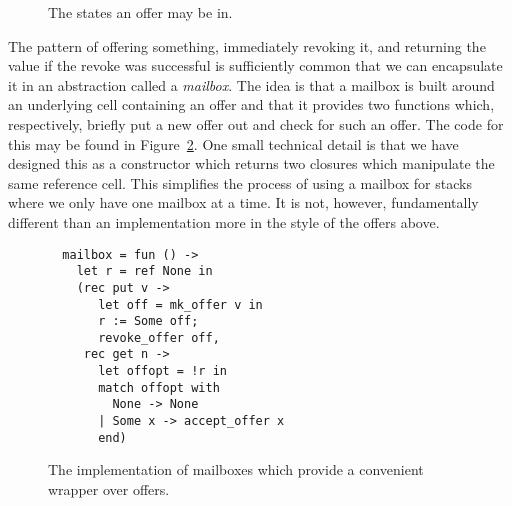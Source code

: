 \begin{figure}
  \caption{The states an offer may be in.}
  \label{fig:code:offertransgraph}
\end{figure}
The pattern of offering something, immediately revoking it, and
returning the value if the revoke was successful is sufficiently
common that we can encapsulate it in an abstraction called a
\emph{mailbox}. The idea is that a mailbox is built around an
underlying cell containing an offer and that it provides two functions
which, respectively, briefly put a new offer out and check for such an
offer. The code for this may be found in
Figure~\ref{fig:code:mailbox}. One small technical detail is that we
have designed this as a constructor which returns two closures which
manipulate the same reference cell. This simplifies the process of
using a mailbox for stacks where we only have one mailbox at a
time. It is not, however, fundamentally different than an
implementation more in the style of the offers above.
\begin{figure}
\begin{lstlisting}
  mailbox = fun () ->
    let r = ref None in
    (rec put v ->
       let off = mk_offer v in
       r := Some off;
       revoke_offer off,
     rec get n ->
       let offopt = !r in
       match offopt with
         None -> None
       | Some x -> accept_offer x
       end)
\end{lstlisting}
\caption{The implementation of mailboxes which provide a convenient
  wrapper over offers.}
\label{fig:code:mailbox}
\end{figure}
